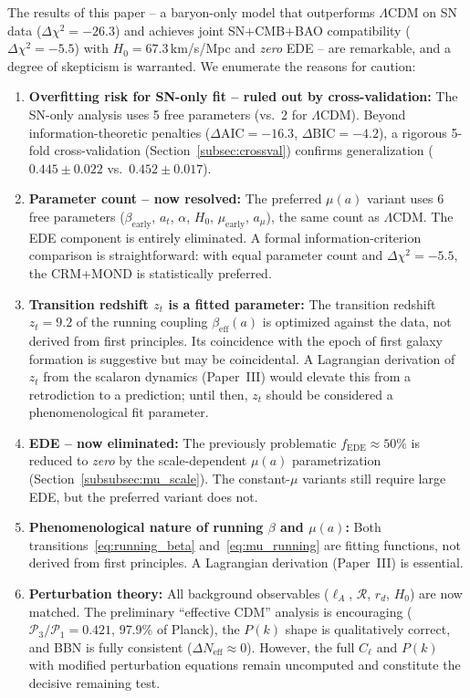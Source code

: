 \documentclass[aps,prd,twocolumn,superscriptaddress,nofootinbib]{revtex4-2}
\begin{document}
The results of this paper -- a baryon-only model that outperforms $\Lambda$CDM on SN data ($\Delta\chi^2 = -26.3$) and achieves joint SN+CMB+BAO compatibility ($\Delta\chi^2 = -5.5$) with $H_0 = 67.3$\,km/s/Mpc and \textit{zero} EDE -- are remarkable, and a degree of skepticism is warranted. We enumerate the reasons for caution:

\begin{enumerate}
\item \textbf{Overfitting risk for SN-only fit -- ruled out by cross-validation:} The SN-only analysis uses 5 free parameters (vs.\ 2 for $\Lambda$CDM). Beyond information-theoretic penalties ($\Delta\mathrm{AIC} = -16.3$, $\Delta\mathrm{BIC} = -4.2$), a rigorous 5-fold cross-validation (Section~\ref{subsec:crossval}) confirms generalization ($0.445 \pm 0.022$ vs.\ $0.452 \pm 0.017$).

\item \textbf{Parameter count -- now resolved:} The preferred $\mu(a)$ variant uses 6 free parameters ($\beta_{\mathrm{early}}$, $a_t$, $\alpha$, $H_0$, $\mu_{\mathrm{early}}$, $a_\mu$), the same count as $\Lambda$CDM. The EDE component is entirely eliminated. A formal information-criterion comparison is straightforward: with equal parameter count and $\Delta\chi^2 = -5.5$, the CRM+MOND is statistically preferred.

\item \textbf{Transition redshift $z_t$ is a fitted parameter:} The transition redshift $z_t = 9.2$ of the running coupling $\beta_{\mathrm{eff}}(a)$ is optimized against the data, not derived from first principles. Its coincidence with the epoch of first galaxy formation is suggestive but may be coincidental. A Lagrangian derivation of $z_t$ from the scalaron dynamics (Paper~III) would elevate this from a retrodiction to a prediction; until then, $z_t$ should be considered a phenomenological fit parameter.

\item \textbf{EDE -- now eliminated:} The previously problematic $f_{\mathrm{EDE}} \approx 50\%$ is reduced to \textit{zero} by the scale-dependent $\mu(a)$ parametrization (Section~\ref{subsubsec:mu_scale}). The constant-$\mu$ variants still require large EDE, but the preferred variant does not.

\item \textbf{Phenomenological nature of running $\beta$ and $\mu(a)$:} Both transitions~\eqref{eq:running_beta} and~\eqref{eq:mu_running} are fitting functions, not derived from first principles. A Lagrangian derivation (Paper~III) is essential.

\item \textbf{Perturbation theory:} All background observables ($\ell_A$, $\mathcal{R}$, $r_d$, $H_0$) are now matched. The preliminary ``effective CDM'' analysis is encouraging ($\mathcal{P}_3/\mathcal{P}_1 = 0.421$, 97.9\% of Planck), the $P(k)$ shape is qualitatively correct, and BBN is fully consistent ($\Delta N_{\mathrm{eff}} \approx 0$). However, the full $C_\ell$ and $P(k)$ with modified perturbation equations remain uncomputed and constitute the decisive remaining test.
\end{enumerate}
\end{document}
